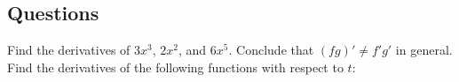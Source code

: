 \subsection*{Questions}
\begin{questions}
  \questioA Find the derivatives of $ 3x^3 $, $ 2x^2 $, and $ 6x^5 $. Conclude that $ (fg)' \neq f' g' $ in general.
  \questioA Find the derivatives of the following functions with respect to $ t $:
\end{questions}
